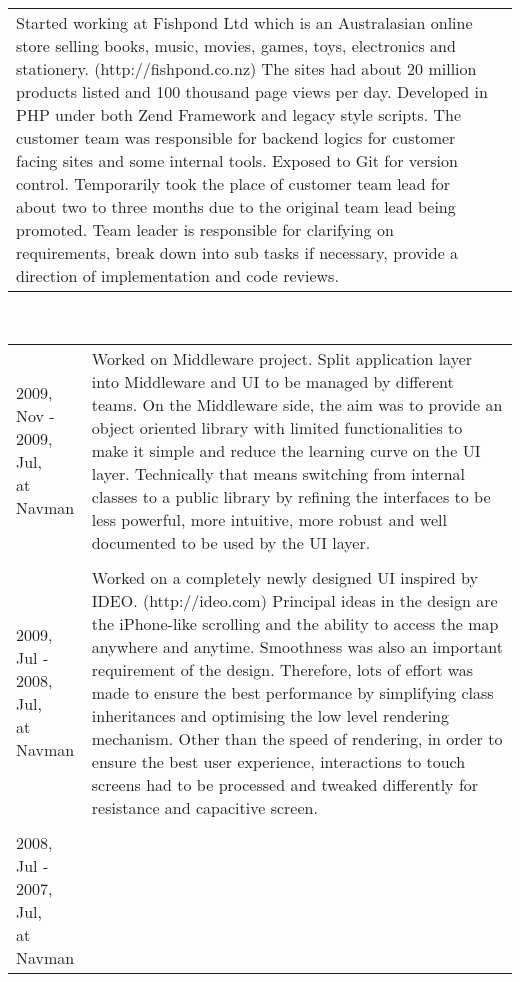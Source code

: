 \begin{resume}
\begin{tabular}{ll}
{Started working at Fishpond Ltd which is an Australasian online store selling books, music, movies, games, toys, electronics and stationery. (http://fishpond.co.nz) The sites had about 20 million products listed and 100 thousand page views per day. Developed in PHP under both Zend Framework and legacy style scripts. The customer team was responsible for backend logics for customer facing sites and some internal tools. Exposed to Git for version control. Temporarily took the place of customer team lead for about two to three months due to the original team lead being promoted. Team leader is responsible for clarifying on requirements, break down into sub tasks if necessary, provide a direction of implementation and code reviews. 

}\end{tabular}\\
\begin{tabular}{ll}
\parbox[t]{35mm}{2009, Nov - \\ 2009, Jul,\\at Navman} & \parbox[t]{111mm}{

Worked on Middleware project. Split application layer into Middleware and UI to be managed by different teams. On the Middleware side, the aim was to provide an object oriented library with limited functionalities to make it simple and reduce the learning curve on the UI layer. Technically that means switching from internal classes to a public library by refining the interfaces to be less powerful, more intuitive, more robust and well documented to be used by the UI layer.

}\\\\
\parbox[t]{35mm}{2009, Jul - \\ 2008, Jul,\\at Navman} & \parbox[t]{111mm}{

Worked on a completely newly designed UI inspired by IDEO. (http://ideo.com) Principal ideas in the design are the iPhone-like scrolling and the ability to access the map anywhere and anytime. Smoothness was also an important requirement of the design. Therefore, lots of effort was made to ensure the best performance by simplifying class inheritances and optimising the low level rendering mechanism. Other than the speed of rendering, in order to ensure the best user experience, interactions to touch screens had to be processed and tweaked differently for resistance and capacitive screen.

}\\\\
\parbox[t]{35mm}{2008, Jul - \\ 2007, Jul,\\at Navman} & \parbox[t]{111mm}{

}
\end{tabular}
\end{resume}
